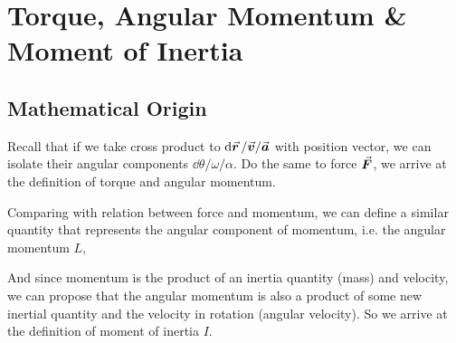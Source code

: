 \documentclass[class=article, crop=false, 12pt]{standalone}
\begin{document}
\linesep
\section{Torque, Angular Momentum \& Moment of Inertia}

\subsection{Mathematical Origin}

Recall that if we take cross product to $\dd{\va*{r}}/\va*{v}/\va*{a}$ with position vector, 
we can isolate their angular components $\dd{\theta}/\omega/\alpha$. Do the same to force $\va*{F}$, 
we arrive at the definition of torque and angular momentum.

Comparing with relation between force and momentum, we can define a similar quantity that represents the angular component of momentum,
i.e. the angular momentum $L$,

And since momentum is the product of an inertia quantity (mass) and velocity, 
we can propose that the angular momentum is also a product of some new inertial quantity and the velocity in rotation (angular velocity).
So we arrive at the definition of moment of inertia $I$.
\end{document}
